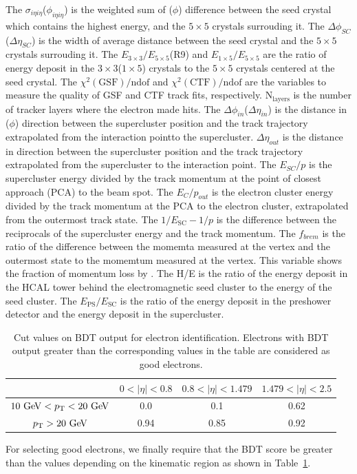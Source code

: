 The $\sigma_{i\eta i\eta}$($\phi_{i\eta i\eta}$) is the weighted sum of \Eta($\phi$) 
difference between the seed crystal which contains the highest energy, 
and the $5\times5$ crystals surrouding it.
The $\Delta \phi_{SC}$($\Delta \eta_{SC}$) is the width of average distance 
between the seed crystal and the $5\times5$ crystals surrouding it.
The $E_{3\times3}/E_{5\times5}$(R9) and $E_{1\times5}/E_{5\times5}$ 
are the ratio of energy deposit in the $3\times3$($1\times5$) crystals to the
$5\times5$ crystals centered at the seed crystal. 
The $\chi^2(\textrm{GSF})/\textrm{ndof}$ and $\chi^2(\textrm{CTF})/\textrm{ndof}$
are the variables to measure the quality of GSF and CTF track fits, respectively. 
$\textrm{N}_\textrm{layers}$ is the number of tracker layers 
where the electron made hits. 
The $\Delta \phi_{in}$($\Delta \eta_{in}$) is the distance in \Eta($\phi$) direction 
between the supercluster position and the track trajectory extrapolated from 
the interaction pointto the supercluster. 
$\Delta \eta_{out}$ is the distance in \Eta{} direction
between the supercluster position and the track trajectory extrapolated 
from the supercluster to the interaction point.
The $E_{SC}/p$ is the supercluster energy divided by the track momentum 
at the point of closest approach (PCA) to the beam spot.
The $E_C/p_{out}$ is the electron cluster energy divided by the track momentum 
at the PCA to the electron cluster, extrapolated from the outermost track state. 
The $1/E_\textrm{SC} - 1/p$ is the difference between the reciprocals 
of the supercluster energy and the track momentum.
The $f_{brem}$ is the ratio of the difference between the momemta measured 
at the vertex and the outermost state to the momemtum measured at the 
vertex. This variable shows the fraction of momentum loss by \brem. 
The H/E is the ratio of the energy deposit in the HCAL tower behind the electromagnetic 
seed cluster to the energy of the seed cluster.
The $E_{\textrm{PS}}/E_{\textrm{SC}}$ is the ratio of the energy deposit in the preshower 
detector and the energy deposit in the supercluster. 
\begin{table}[!ht]
  \centering 
  \begin{tabular} {c||c|c|c}
  \hline
        & $0<|\eta|<0.8$ & $0.8<|\eta|<1.479$ & $1.479<|\eta|<2.5$\\
  \hline \hline
   $10~\mathrm{Ge\kern -0.1em V}<p_\mathrm{T}<20~\mathrm{Ge\kern -0.1em V}$    & 0.0   & 0.1   & 0.62 \\ 
  \hline
   $p_\mathrm{T}>20~\mathrm{Ge\kern -0.1em V}$            & 0.94  & 0.85  & 0.92 \\ 
  \hline 
  \end{tabular}
  \caption{Cut values on BDT output for electron identification. Electrons with BDT output
  greater than the corresponding values in the table are considered as good electrons.} 
  \label{tab:electronid_bdtcut}
\end{table}
For selecting good electrons, we finally require that the BDT score be greater 
than the values depending on the kinematic region as shown in Table~\ref{tab:electronid_bdtcut}. 

